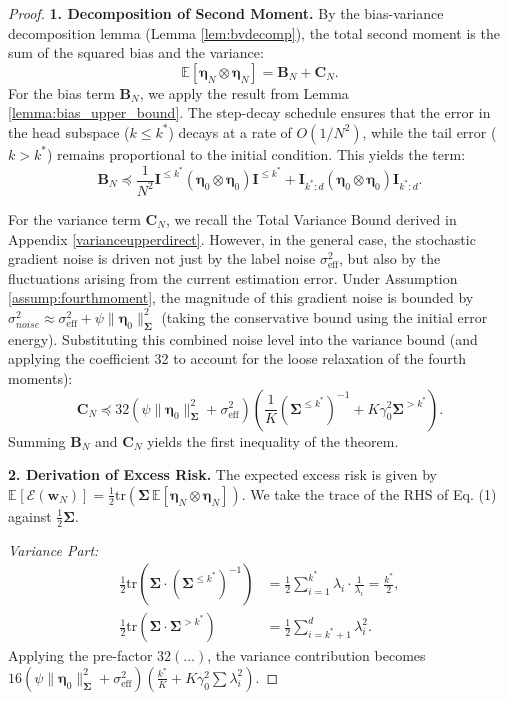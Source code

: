 \documentclass{article}
\theoremstyle{definition}
\theoremstyle{definition}
\theoremstyle{plain}
\theoremstyle{plain}
\theoremstyle{plain}
\theoremstyle{plain}
\theoremstyle{plain}
\newcommand{\bs}[1]{\boldsymbol{\mathbf{#1}}}
\newcommand{\Ex}{\mathbb{E}}
\newcommand{\tr}{\mathrm{tr}}
\newcommand{\eff}{\mathrm{eff}}
\newcommand{\id}{\mathbf{I}}
\newcommand{\ex}[2][]{\mathbb{E}_{#1}\left[ #2 \right]}
\begin{document}
\begin{proof}
    \textbf{1. Decomposition of Second Moment.}
    By the bias-variance decomposition lemma (Lemma \ref{lem:bvdecomp}), the total second moment is the sum of the squared bias and the variance:
    \begin{equation}
        \Ex[\bs\eta_N \otimes \bs\eta_N] = \bs B_N + \bs C_N.
    \end{equation}
    For the bias term $\bs B_N$, we apply the result from Lemma \ref{lemma:bias_upper_bound}. The step-decay schedule ensures that the error in the head subspace ($k \le k^*$) decays at a rate of $O(1/N^2)$, while the tail error ($k > k^*$) remains proportional to the initial condition. This yields the term:
    \begin{equation}
        \bs B_N \preceq \frac{1}{N^2}\id^{\leq k^*}(\bs\eta_0\otimes\bs \eta_0)\id^{\leq k^*} + \id_{k^*:d}(\bs\eta_0\otimes\bs \eta_0)\id_{k^*:d}.
    \end{equation}
    
    For the variance term $\bs C_N$, we recall the Total Variance Bound derived in Appendix \ref{varianceupperdirect}. However, in the general case, the stochastic gradient noise is driven not just by the label noise $\sigma_\eff^2$, but also by the fluctuations arising from the current estimation error. Under Assumption \ref{assump:fourthmoment}, the magnitude of this gradient noise is bounded by $\sigma_{noise}^2 \approx \sigma_\eff^2 + \psi \|\bs\eta_0\|^2_{\bs\Sigma}$ (taking the conservative bound using the initial error energy). Substituting this combined noise level into the variance bound (and applying the coefficient 32 to account for the loose relaxation of the fourth moments):
    \begin{equation}
        \bs C_N \preceq 32 (\psi\|\bs\eta_0\|^2_{\bs\Sigma}+\sigma_\eff^2)\left( \frac{1}{K}(\bs\Sigma^{\leq k^*})^{-1} + K\gamma_0^2 \bs\Sigma^{>k^*} \right).
    \end{equation}
    Summing $\bs B_N$ and $\bs C_N$ yields the first inequality of the theorem.

    \textbf{2. Derivation of Excess Risk.}
    The expected excess risk is given by $\ex{\mathcal{E}(\bs w_N)} = \frac{1}{2} \tr(\bs\Sigma \, \Ex[\bs\eta_N \otimes \bs\eta_N])$. We take the trace of the RHS of Eq. (1) against $\frac{1}{2}\bs\Sigma$.
    
    \textit{Variance Part:}
    \begin{align}
        \frac{1}{2} \tr\left( \bs\Sigma \cdot (\bs\Sigma^{\leq k^*})^{-1} \right) &= \frac{1}{2} \sum_{i=1}^{k^*} \lambda_i \cdot \frac{1}{\lambda_i} = \frac{k^*}{2}, \\
        \frac{1}{2} \tr\left( \bs\Sigma \cdot \bs\Sigma^{> k^*} \right) &= \frac{1}{2} \sum_{i=k^*+1}^d \lambda_i^2.
    \end{align}
    Applying the pre-factor $32 (\dots)$, the variance contribution becomes $16 (\psi\|\bs\eta_0\|^2_{\bs\Sigma}+\sigma_\eff^2) (\frac{k^*}{K} + K\gamma_0^2 \sum \lambda_i^2)$.
    

\end{proof}
\end{document}
